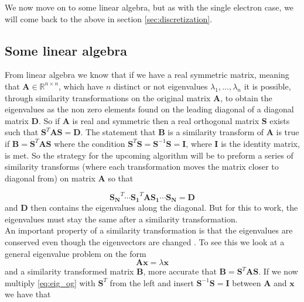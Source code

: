 \documentclass[12pt]{article}
\numberwithin{figure}{section}
\numberwithin{table}{section}
\begin{document}
\noindent We now move on to some linear algebra, but as with the single electron case, we will come back to the above in section \ref{sec:discretization}.

\subsection{Some linear algebra} \label{sec:linalg}

\noindent From linear algebra \cite{Comp} we know that if we have a real symmetric matrix, meaning that $\mathbf{A} \in \mathbb{R}^{n\times n}$, which have $n$ distinct or not eigenvalues $\lambda_1, ..., \lambda_{n} $ it is possible, through similarity transformations on the original matrix $\mathbf{A}$, to obtain the eigenvalues as the non zero elements found on the leading diagonal of a diagonal matrix $\mathbf{D}$. So if $\mathbf{A}$ is real and symmetric then a real orthogonal matrix $\mathbf{S}$ exists such that $\mathbf{S}^T \mathbf{A} \mathbf{S} = \mathbf{D}$. The statement that $\mathbf{B}$ is a similarity transform of $\mathbf{A}$ is true \cite{Comp} if $\mathbf{B} = \mathbf{S}^T \mathbf{A} \mathbf{S}$ where the condition $\mathbf{S}^T \mathbf{S} = \mathbf{S}^{-1} \mathbf{S} = \mathbf{I}$, where $\mathbf{I}$ is the identity matrix, is met. So the strategy for the upcoming algorithm will be to preform a series of similarity transforms (where each transformation moves the matrix closer to diagonal from) on matrix $\mathbf{A}$ so that

\begin{equation}
 \mathbf{S_N}^T \cdots \mathbf{S_1}^T \mathbf{A} \mathbf{S_1} \cdots \mathbf{S_N} = \mathbf{D} 
\end{equation}
and $\mathbf{D}$ then contains the eigenvalues along the diagonal. But for this to work, the eigenvalues must stay the same after a similarity transformation. \\

\noindent An important property of a similarity transformation is that the eigenvalues are conserved even though the eigenvectors are changed \cite{Comp}. To see this we look at a general eigenvalue problem on the form
\begin{equation}
	\mathbf{A} \mathbf{x}  = \lambda \mathbf{x} \label{eq:eig_og}
\end{equation}
and a similarity transformed matrix $\mathbf{B}$, more accurate that $\mathbf{B} = \mathbf{S}^T \mathbf{A} \mathbf{S}$. If we now multiply \eqref{eq:eig_og} with $\mathbf{S}^T$ from the left and insert $\mathbf{S}^{-1} \mathbf{S} = \mathbf{I}$ between $\mathbf{A}$ and $\mathbf{x}$ we have that 
\end{document}
